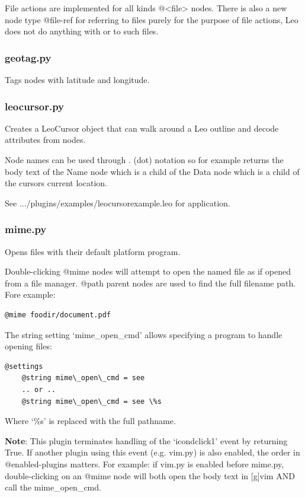 \documentclass[a4paper,10pt,english]{sphinxmanual}
\begin{document}
File actions are implemented for all kinds @\textless{}file\textgreater{} nodes. There is also a new
node type @file-ref for referring to files purely for the purpose of file
actions, Leo does not do anything with or to such files.


\subsubsection{geotag.py}
\label{plugins:geotag-py}
Tags nodes with latitude and longitude.


\subsubsection{leocursor.py}
\label{plugins:leocursor-py}
Creates a LeoCursor object that can walk around a Leo outline and decode
attributes from nodes.

Node names can be used through . (dot) notation so  for
example returns the body text of the Name node which is a child of the Data node
which is a child of the cursors current location.

See .../plugins/examples/leocursorexample.leo for application.


\subsubsection{mime.py}
\label{plugins:mime-py}
Opens files with their default platform program.

Double-clicking @mime nodes will attempt to open the named file as if opened
from a file manager. @path parent nodes are used to find the full filename
path.  Fore example:

\begin{Verbatim}[commandchars=\\\{\}]
@mime foodir/document.pdf
\end{Verbatim}

The string setting `mime\_open\_cmd' allows specifying a program to handle opening
files:

\begin{Verbatim}[commandchars=\\\{\}]
@settings
    @string mime\_open\_cmd = see
    .. or ..
    @string mime\_open\_cmd = see \%s
\end{Verbatim}

Where `\%s' is replaced with the full pathname.

\textbf{Note}: This plugin terminates handling of the `icondclick1' event by returning
True. If another plugin using this event (e.g. vim.py) is also enabled, the
order in @enabled-plugins matters. For example: if vim.py is enabled before
mime.py, double-clicking on an @mime node will both open the body text in {[}g{]}vim
AND call the mime\_open\_cmd.
\end{document}

